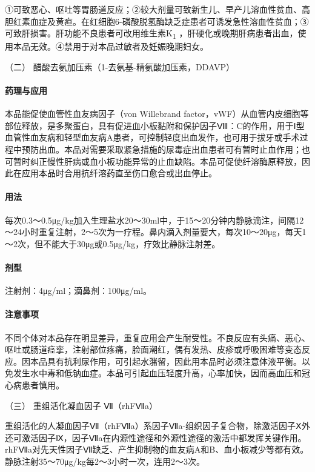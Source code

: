 ①可致恶心、呕吐等胃肠道反应；②较大剂量可致新生儿、早产儿溶血性贫血、高胆红素血症及黄疸。在红细胞6-磷酸脱氢酶缺乏症患者可诱发急性溶血性贫血；③可致肝损害。肝功能不良患者可改用维生素K\textsubscript{1}
，肝硬化或晚期肝病患者出血，使用本品无效。④禁用于对本品过敏者及妊娠晚期妇女。

\hypertarget{text00438.htmlux5cux23CHP17-8-1-2}{}
（二） 醋酸去氨加压素（1-去氨基-精氨酸加压素，DDAVP）

\paragraph{药理与应用}

本品能促使血管性血友病因子（von Willebrand
factor，vWF）从血管内皮细胞等部位释放，是多聚蛋白，具有促进血小板黏附和保护因子Ⅷ：C的作用，用于Ⅰ型血管性血友病和轻型血友病A患者，可控制轻度出血发作，也可用于拔牙或手术过程中预防出血。本品对需要采取紧急措施的尿毒症出血患者可有暂时止血作用；也可暂时纠正慢性肝病或血小板功能异常的止血缺陷。本品可促使纤溶酶原释放，因此在应用本品时合用抗纤溶药直至伤口愈合或出血停止。

\paragraph{用法}

每次0.3～0.5μg/kg加入生理盐水20～30ml中，于15～20分钟内静脉滴注，间隔12～24小时重复注射，2～5次为一疗程。鼻内滴入剂量要大，每次10～20μg，每天1～2次，但不能大于30μg或0.5μg/kg，疗效比静脉注射差。

\paragraph{剂型}

注射剂：4μg/ml；滴鼻剂：100μg/ml。

\paragraph{注意事项}

不同个体对本品存在明显差异，重复应用会产生耐受性。不良反应有头痛、恶心、呕吐或肠道痉挛，注射部位疼痛，脸面潮红，偶有发热、皮疹或呼吸困难等变态反应。因本品具有抗利尿作用，可引起水潴留，因此用本品时必须注意体液平衡。以免发生水中毒和低钠血症。本品可引起血压轻度升高，心率加快，因而高血压和冠心病患者慎用。

\hypertarget{text00438.htmlux5cux23CHP17-8-1-3}{}
（三） 重组活化凝血因子 Ⅶ（rhFⅦa）

重组活化的人凝血因子Ⅶ（rhFⅦa）系因子Ⅶa-组织因子复合物，除激活因子Ⅹ外还可激活因子Ⅸ，因子Ⅶa在内源性途径和外源性途径的激活中都发挥关键作用。rhFⅦa对先天性因子Ⅶ缺乏、产生抑制物的血友病A和B、血小板减少等都有效。静脉注射35～70μg/kg每2～3小时一次，连用2～3次。

